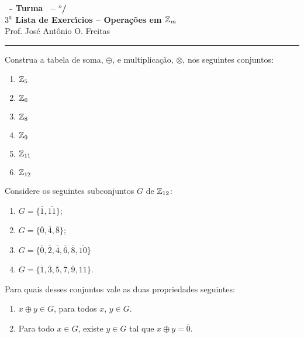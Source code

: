 \documentclass[12pt]{exam}
\begin{document}
\begin{center}
{\Large\bf \disciplina\ - Turma \turma\ -- \semestre$^{o}$/\ano} \\ \vspace{9pt} {\large\bf
  $3^{\underline{a}}$ Lista de Exerc{\'\i}cios -- Operações em $\mathbb{Z}_m$}\\ \vspace{9pt} Prof. Jos{\'e} Ant{\^o}nio O. Freitas
\end{center}
\hrule

\vspace{.6cm}

\questao Construa a tabela de soma, $\oplus$, e multiplicação, $\otimes$, nos seguintes conjuntos:
\begin{multicols}{3}
	\begin{enumerate}[label=({\alph*})]
		\item $\mathbb{Z}_5$
		\item $\mathbb{Z}_6$
		\item $\mathbb{Z}_8$
		\item $\mathbb{Z}_9$
		\item $\mathbb{Z}_{11}$
		\item $\mathbb{Z}_{12}$
	\end{enumerate}
\end{multicols}

\vspace{.3cm}

\questao Considere os seguintes subconjuntos $G$ de $\mathbb{Z}_{12}$:
\begin{multicols}{2}
	\begin{enumerate}[label=({\alph*})]
		\item $G=\{\overline{1},\overline{11}\}$;

		\item $G=\{\overline{0},\overline{4},\overline{8}\}$;

		\item $G=\{\overline{0},\overline{2},\overline{4},\overline{6},\overline{8},\overline{10}\}$
		\item $G=\{\overline{1}, \overline{3},\overline{5},\overline{7},\overline{9},\overline{11}\}$.
	\end{enumerate}
\end{multicols}

Para quais desses conjuntos vale as duas propriedades seguintes:
\begin{enumerate}[label=({\roman*})]
	\item $x \oplus y \in G$, para todos $x$, $y \in G$.
	\item Para todo $x \in G$, existe $y \in G$ tal que $x \oplus y = \overline{0}$.
\end{enumerate}
\end{document}
